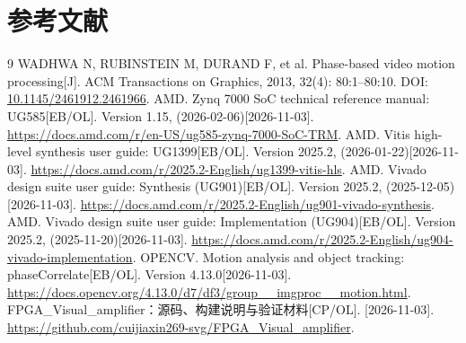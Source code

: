 \section{参考文献}
\begingroup
{}
\renewcommand{\bibsection}{}
\begin{thebibliography}{9}
WADHWA N, RUBINSTEIN M, DURAND F, et al. Phase-based video motion processing[J]. ACM Transactions on Graphics, 2013, 32(4): 80:1--80:10. DOI: \href{https://doi.org/10.1145/2461912.2461966}{10.1145/2461912.2461966}.
AMD. Zynq 7000 SoC technical reference manual: UG585[EB/OL]. Version 1.15, (2026-02-06)[2026-11-03]. \url{https://docs.amd.com/r/en-US/ug585-zynq-7000-SoC-TRM}.
AMD. Vitis high-level synthesis user guide: UG1399[EB/OL]. Version 2025.2, (2026-01-22)[2026-11-03]. \url{https://docs.amd.com/r/2025.2-English/ug1399-vitis-hls}.
AMD. Vivado design suite user guide: Synthesis (UG901)[EB/OL]. Version 2025.2, (2025-12-05)[2026-11-03]. \url{https://docs.amd.com/r/2025.2-English/ug901-vivado-synthesis}.
AMD. Vivado design suite user guide: Implementation (UG904)[EB/OL]. Version 2025.2, (2025-11-20)[2026-11-03]. \url{https://docs.amd.com/r/2025.2-English/ug904-vivado-implementation}.
OPENCV. Motion analysis and object tracking: phaseCorrelate[EB/OL]. Version 4.13.0[2026-11-03]. \url{https://docs.opencv.org/4.13.0/d7/df3/group__imgproc__motion.html}.
FPGA\_Visual\_amplifier：源码、构建说明与验证材料[CP/OL]. [2026-11-03]. \url{https://github.com/cuijiaxin269-svg/FPGA_Visual_amplifier}.
\end{thebibliography}
\endgroup
